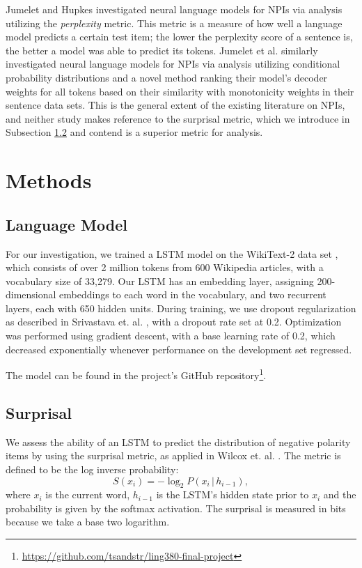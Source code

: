 \documentclass[11pt, round]{article}
\begin{document}
Jumelet and Hupkes  investigated neural language models for NPIs via analysis utilizing the \textit{perplexity} metric. This metric is a measure of how well a language model predicts a certain test item; the lower the perplexity score of a sentence is, the better a model was able to predict its tokens. Jumelet et al.  similarly investigated neural language models for NPIs via analysis utilizing conditional probability distributions and a novel method ranking their model's decoder weights for all tokens based on their similarity with monotonicity weights in their sentence data sets. This is the general extent of the existing literature on NPIs, and neither study makes reference to the surprisal metric, which we introduce in Subsection \ref{sec:surpisal} and contend is a superior metric for analysis.

\section{Methods}

\subsection{Language Model}

For our investigation, we trained a LSTM model on the WikiText-2 data set \cite{merity2016pointer}, which consists of over 2 million tokens from 600 Wikipedia articles, with a vocabulary size of 33,279. Our LSTM has an embedding layer, assigning 200-dimensional embeddings to each word in the vocabulary, and two recurrent layers, each with 650 hidden units. During training, we use dropout regularization as described in Srivastava et. al. , with a dropout rate set at 0.2. Optimization was performed using gradient descent, with a base learning rate of 0.2, which decreased exponentially whenever performance on the development set regressed.

The model can be found in the project's GitHub repository\footnote{\url{https://github.com/tsandstr/ling380-final-project}}.

\subsection{Surprisal}
\label{sec:surpisal}

We assess the ability of an LSTM to predict the distribution of negative polarity items by using the surprisal metric, as applied in Wilcox et. al. . The metric is defined to be the log inverse probability:
\[ S(x_i) = -\log_2 P(x_i \, | \, h_{i-1}), \]
where $x_i$ is the current word, $h_{i-1}$ is the LSTM's hidden state prior to $x_i$ and the probability is given by the softmax activation. The surprisal is measured in bits because we take a base two logarithm.
\end{document}
